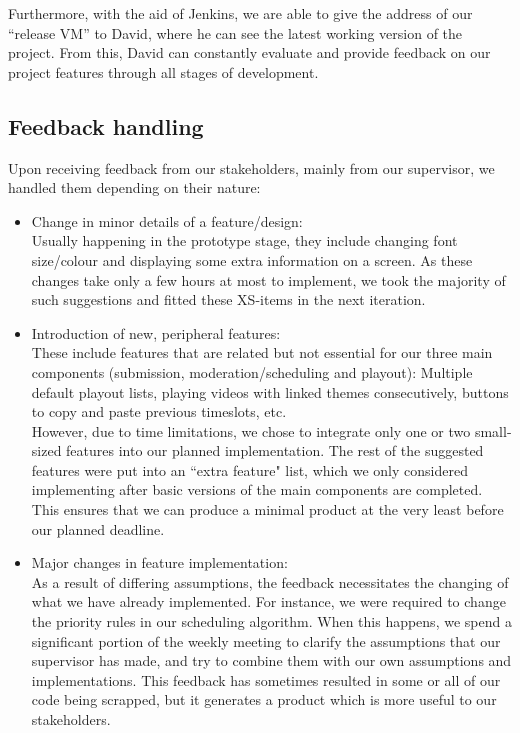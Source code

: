\documentclass[a4paper]{article}
\begin{document}
Furthermore, with the aid of Jenkins, we are able to give the address of our ``release VM'' to David, where he can see the latest working version of the project. From this, David can constantly evaluate and provide feedback on our project features through all stages of development.

\subsection{Feedback handling}

Upon receiving feedback from our stakeholders, mainly from our supervisor, we handled them depending on their nature:

\begin{itemize}

  \item Change in minor details of a feature/design: \\
        Usually happening in the prototype stage, they include changing font size/colour and displaying some extra information on a screen. As these changes take only a few hours at most to implement, we took the majority of such suggestions and fitted these XS-items in the next iteration.

  \item Introduction of new, peripheral features: \\
        These include features that are related but not essential for our three main components (submission, moderation/scheduling and playout): Multiple default playout lists, playing videos with linked themes consecutively, buttons to copy and paste previous timeslots, etc. \\
        However, due to time limitations, we chose to integrate only one or two small-sized features into our planned implementation. The rest of the suggested features were put into an ``extra feature" list, which we only considered implementing after basic versions of the main components are completed. This ensures that we can produce a minimal product at the very least before our planned deadline.

  \item Major changes in feature implementation: \\
        As a result of differing assumptions, the feedback necessitates the changing of what we have already implemented. For instance, we were required to change the priority rules in our scheduling algorithm. When this happens, we spend a significant portion of the weekly meeting to clarify the assumptions that our supervisor has made, and try to combine them with our own assumptions and implementations. This feedback has sometimes resulted in some or all of our code being scrapped, but it generates a product which is more useful to our stakeholders.

\end{itemize}
\end{document}
